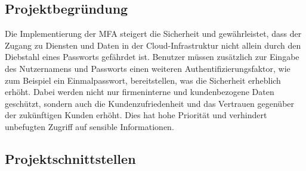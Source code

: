 \subsection{Projektbegründung} 
\label{sec:Projektbegruendung}
Die Implementierung der MFA steigert die Sicherheit und gewährleistet, dass der Zugang zu Diensten und Daten in der 
Cloud-Infrastruktur nicht allein durch den Diebstahl eines Passworts gefährdet ist. Benutzer müssen zusätzlich zur Eingabe des 
Nutzernamens und Passworts einen weiteren Authentifizierungsfaktor, wie zum Beispiel ein Einmalpasswort, bereitstellen, 
was die Sicherheit erheblich erhöht. Dabei werden nicht nur firmeninterne und kundenbezogene Daten geschützt, sondern auch 
die Kundenzufriedenheit und das Vertrauen gegenüber der zukünftigen Kunden erhöht. Dies hat hohe Priorität und verhindert 
unbefugten Zugriff auf sensible Informationen.


\subsection{Projektschnittstellen} 
\label{sec:Projektschnittstellen}

